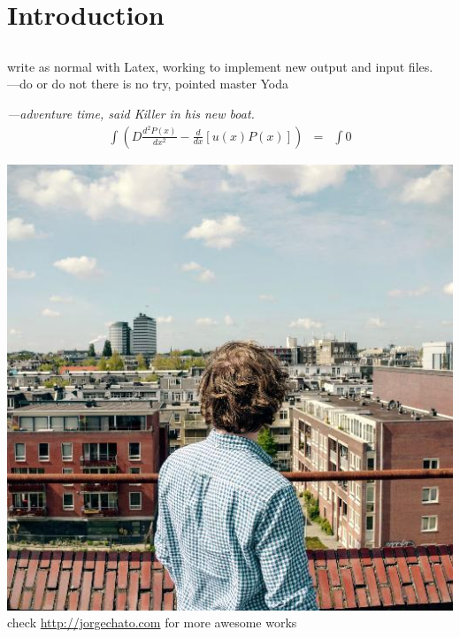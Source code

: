 \chapter{Introduction}
\section{}
write as normal with Latex, working to implement new output and input files.\\
---do or do not there is no try, pointed master Yoda\par
\textit{---adventure time, said Killer in his new boat.}\\
\begin{eqnarray}
\int ( D \frac{d^2 P(x)}{dx^2}-\frac{d}{dx}[u(x)P(x)] ) & = & \int 0
\end{eqnarray}\par
\includegraphics{./images/0.jpg}\\
check \url{http://jorgechato.com} for more awesome works

